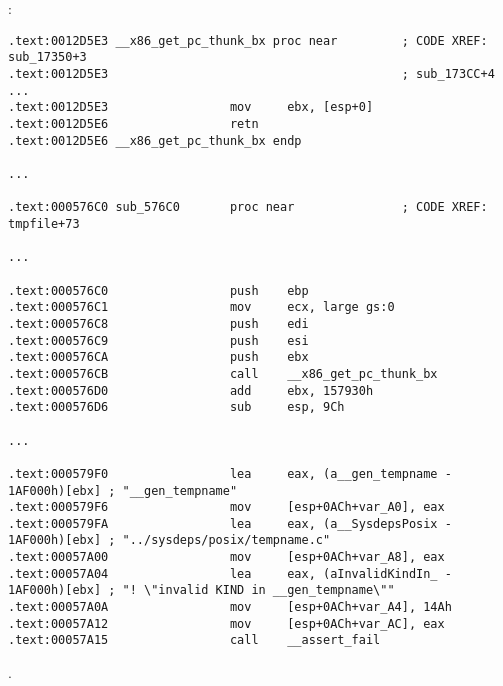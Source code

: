 \section{\CapitalPICcode}
\index{\PICcode}
\label{sec:PIC}

:

\begin{lstlisting}[caption=libc-2.17.so x86]
.text:0012D5E3 __x86_get_pc_thunk_bx proc near         ; CODE XREF: sub_17350+3
.text:0012D5E3                                         ; sub_173CC+4 ...
.text:0012D5E3                 mov     ebx, [esp+0]
.text:0012D5E6                 retn
.text:0012D5E6 __x86_get_pc_thunk_bx endp

...

.text:000576C0 sub_576C0       proc near               ; CODE XREF: tmpfile+73

...

.text:000576C0                 push    ebp
.text:000576C1                 mov     ecx, large gs:0
.text:000576C8                 push    edi
.text:000576C9                 push    esi
.text:000576CA                 push    ebx
.text:000576CB                 call    __x86_get_pc_thunk_bx
.text:000576D0                 add     ebx, 157930h
.text:000576D6                 sub     esp, 9Ch

...

.text:000579F0                 lea     eax, (a__gen_tempname - 1AF000h)[ebx] ; "__gen_tempname"
.text:000579F6                 mov     [esp+0ACh+var_A0], eax
.text:000579FA                 lea     eax, (a__SysdepsPosix - 1AF000h)[ebx] ; "../sysdeps/posix/tempname.c"
.text:00057A00                 mov     [esp+0ACh+var_A8], eax
.text:00057A04                 lea     eax, (aInvalidKindIn_ - 1AF000h)[ebx] ; "! \"invalid KIND in __gen_tempname\""
.text:00057A0A                 mov     [esp+0ACh+var_A4], 14Ah
.text:00057A12                 mov     [esp+0ACh+var_AC], eax
.text:00057A15                 call    __assert_fail
\end{lstlisting}

.

